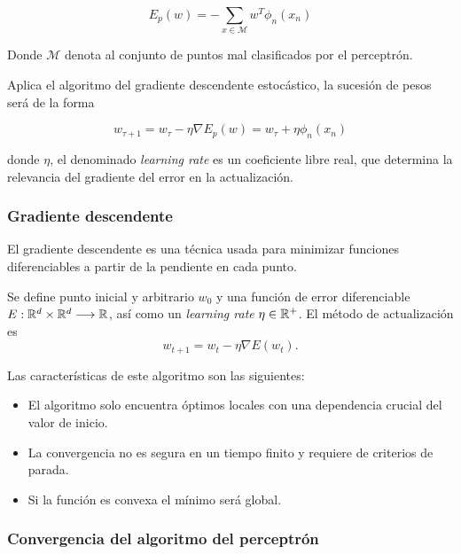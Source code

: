 \begin{equation}
    E_p(w) = - \sum_{x \in \mathcal M} w^T \phi_n (x_n)
\end{equation}

Donde $\mathcal M$ denota al conjunto de puntos mal clasificados por el perceptrón.

Aplica el algoritmo del gradiente descendente estocástico, la sucesión de pesos será de la forma

\begin{equation}
    w_{\tau+1} = 
    w_{\tau} - \eta \nabla E_p(w)
     = 
     w_{\tau} + \eta \phi_n (x_n)
\end{equation}

donde $\eta$, el denominado  \textit{learning rate}
es un coeficiente libre real, que determina la relevancia del gradiente del error en la actualización. 

\subsubsection{Gradiente descendente}  

El gradiente descendente es una técnica usada para minimizar funciones diferenciables
a partir de la pendiente en cada punto. 

Se define punto inicial y arbitrario $w_0$ y una función de error diferenciable
$E: \mathbb{R}^d \times \mathbb{R}^d \longrightarrow \mathbb{R}$, así como un \textit{learning rate} 
$\eta \in \mathbb{R}^+$. 
El método de actualización es 
\begin{equation}
    w_{t+1}  = w_t - \eta \nabla E(w_t).
\end{equation}

Las características de este algoritmo son las siguientes: 

\begin{itemize}
    \item El algoritmo solo encuentra óptimos locales con una dependencia crucial del valor de inicio. 
    \item La convergencia no es segura en un tiempo finito y requiere de criterios de parada. 
    \item Si la función es convexa el mínimo será global. 
\end{itemize}

\subsubsection{Convergencia del algoritmo del perceptrón}  

